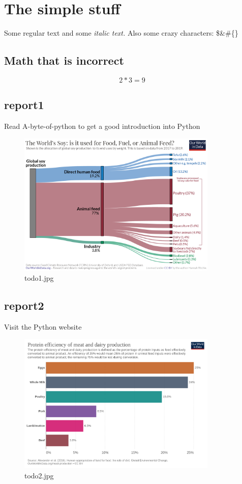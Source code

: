 \documentclass{article}%
\begin{document}
%
\normalsize%
\section{The simple stuff}%
\label{sec:Thesimplestuff}%
Some regular text and some%
\textit{italic text. }%
\newline%
Also some crazy characters: \$\&\#\{\}%
\subsection{Math that is incorrect}%
\label{subsec:Maththatisincorrect}%
\[%
2*3 = 9%
\]

%
\subsection{report1}%
\label{subsec:report1}%
Read A{-}byte{-}of{-}python to get a good introduction into Python%


\begin{figure}[htb!]%
\centering%
\includegraphics[width=360px]{todo1.jpg}%
\caption{todo1.jpg}%
\end{figure}

%
\FloatBarrier

%
\subsection{report2}%
\label{subsec:report2}%
Visit the Python website%


\begin{figure}[htb!]%
\centering%
\includegraphics[width=360px]{todo2.jpg}%
\caption{todo2.jpg}%
\end{figure}
\end{document}
